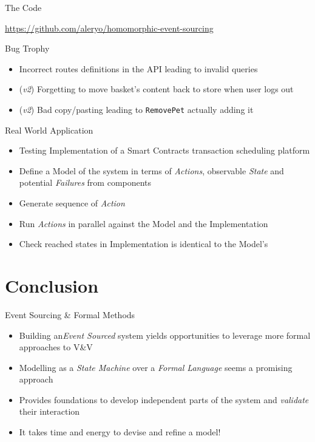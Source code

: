 \begin{frame}[fragile]{The Code}
  \begin{center}
  \url{https://github.com/aleryo/homomorphic-event-sourcing}
  \end{center}
\end{frame}

\begin{frame}[fragile]{Bug Trophy}
  \begin{itemize}[<+->]
  \item Incorrect routes definitions in the API leading to invalid queries
  \item (\emph{v2}) Forgetting to move basket's content back to store when user logs out
  \item (\emph{v2}) Bad copy/pasting leading to \texttt{RemovePet} actually adding it
  \end{itemize}
\end{frame}

\begin{frame}[fragile]{Real World Application}
  \begin{itemize}[<+->]
  \item Testing Implementation of a Smart Contracts transaction scheduling platform
  \item Define a Model of the system in terms of \emph{Actions}, observable \emph{State} and potential \emph{Failures} from components
  \item Generate sequence of \emph{Action}
  \item Run \emph{Actions} in parallel against the Model and the Implementation
  \item Check reached states in Implementation is identical to the Model's
  \end{itemize}
\end{frame}


\part{Conclusion}

\begin{frame}[fragile]{Event Sourcing \& Formal Methods}
  \begin{itemize}[<+->]
  \item Building an\emph{Event Sourced} system yields opportunities to leverage more formal approaches to V\&V
  \item Modelling as a \emph{State Machine} over a \emph{Formal Language} seems a promising approach
  \item Provides foundations to develop independent parts of the system and \emph{validate} their interaction
  \item It takes time and energy to devise and refine a model!
  \end{itemize}
\end{frame}

